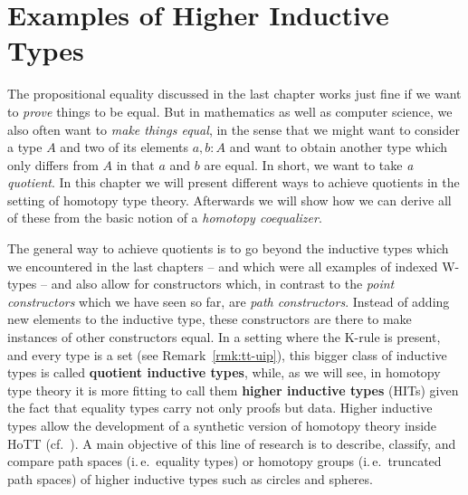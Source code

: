 \section{Examples of Higher Inductive Types}

The propositional equality discussed in the last chapter works just fine if we want
to \emph{prove} things to be equal.
But in mathematics as well as computer science, we also often want to
\emph{make things equal}, in the sense that we might want to consider a type
$A$ and two of its elements $a, b : A$ and want to obtain
another type which only differs from $A$ in that $a$ and $b$ are equal.
In short, we want to take \emph{a quotient}.
In this chapter we will present different ways to achieve quotients in the setting
of homotopy type theory.
Afterwards we will show how we can derive all of these from the basic notion
of a \emph{homotopy coequalizer}.

The general way to achieve quotients is to go beyond the inductive types
which we encountered in the last chapters -- and which were all examples of
indexed W-types --
and also allow for constructors which,
in contrast to the \emph{point constructors} which we have seen so far,
are \emph{path constructors}.
Instead of adding new elements to the inductive type,
these constructors are there to make instances of other constructors equal.
In a setting where the K-rule is present, and every type is a set (see Remark~\ref{rmk:tt-uip}),
this bigger class of inductive types is called \textbf{quotient inductive types},
while, as we will see, in homotopy type theory it is more
fitting to call them \textbf{higher inductive types} (HITs) given the fact
that equality types carry not only proofs but data.
Higher inductive types
allow the development of a synthetic version of homotopy theory inside HoTT (cf.~\cite{Buchholtz2018,Buchholtz2018CellularCI,buchholtz2016cayley,BuchRijke_projectiveSpaces,favonia:SvK,licataFinster_Eilenberg,licataBrunerie_s1again,Brunerie2017,rijke:join}).
A main objective of this line of research is to describe, classify, and compare
path spaces (i.\,e.\ equality types) or homotopy groups (i.\,e.\ truncated path spaces)
of higher inductive types such as circles and spheres.

